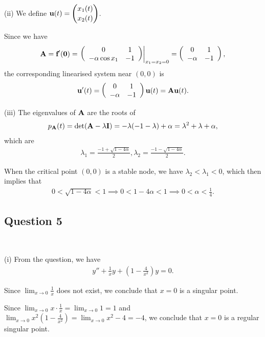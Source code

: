 \documentclass[12pt]{amsart}
\theoremstyle{plain}
\theoremstyle{definition}
\def\bf{\textbf}
\newcommand{\RA}{\implies}
\newcommand{\rA}{\rightarrow}
\begin{document}
(ii) We define $\displaystyle \bf u(t)=\binom{x_1(t)}{x_2(t)}$.

Since we have
\begin{align*}
	\bf A=\bf f'(\bf 0)=\left.\left(
	\begin{array}{cc}
		0 & 1\\
		-\alpha\cos x_1&-1
	\end{array}
	\right)\right|_{x_1=x_2=0}=\left(
	\begin{array}{cc}
		0 & 1\\
		-\alpha & -1
	\end{array}
	\right),
\end{align*}
the corresponding linearised system near $(0,0)$ is 
\begin{align*}
	\bf u'(t)=\left(
	\begin{array}{cc}
		0 & 1\\
		-\alpha & -1
	\end{array}
	\right)\bf u(t)=\bf A\bf u(t).
\end{align*} 

(iii) The eigenvalues of $\bf A$ are the roots of
\begin{align*}
	p_\bf A(t)=\det(\bf A-\lambda \bf I)=-\lambda(-1-\lambda)+\alpha=\lambda^2+\lambda+\alpha,
\end{align*}
which are
\begin{align*}
	\lambda_1=\frac{-1+\sqrt{1-4\alpha}}{2},\lambda_2=\frac{-1-\sqrt{1-4\alpha}}{2}.
\end{align*}

When the critical point $(0,0)$ is a stable node, we have $\lambda_2<\lambda_1<0$, which then implies that
\begin{align*}
	0<\sqrt{1-4\alpha}< 1\RA 0<1-4\alpha<1\RA 0< \alpha<\frac14.
\end{align*}

\subsection*{Question 5} \ 

(i) From the question, we have
\begin{align*}\tag{1}
	y''+\frac1x y+\left(1-\frac4{x^2}\right)y=0.
\end{align*}

Since $\displaystyle \lim_{x\rA0}\frac1x$ does not exist, we conclude that $x=0$ is a singular point.

Since $\displaystyle\lim_{x\rA0}x\cdot \frac1x=\lim_{x\rA0}1=1$ and $\displaystyle \lim_{x\rA0}x^2\left(1-\frac4{x^2}\right)=\lim_{x\rA0}x^2-4=-4$, we conclude that $x=0$ is a regular singular point.
\end{document}

